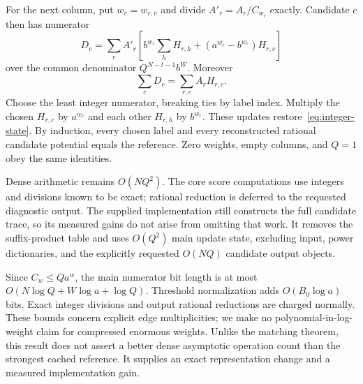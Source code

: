 For the next column, put $w_r=w_{r,v}$ and divide
$A'_r=A_r/C_{w_r}$ exactly. Candidate $c$ then has numerator
\begin{equation}\label{eq:integer-candidate}
 D_c=\sum_r A'_r\left[
 b^{w_r}\sum_hH_{r,h}+(a^{w_r}-b^{w_r})H_{r,c}\right]
\end{equation}
over the common denominator $Q^{N-t-1}b^W$. Moreover
\[
 \sum_cD_c=\sum_{r,c}A_rH_{r,c}.
\]
Choose the least integer numerator, breaking ties by label index. Multiply
the chosen $H_{r,c}$ by $a^{w_r}$ and each other $H_{r,h}$ by $b^{w_r}$.
These updates restore~\eqref{eq:integer-state}. By induction, every chosen
label and every reconstructed rational candidate potential equals the
reference. Zero weights, empty columns, and $Q=1$ obey the same identities.

Dense arithmetic remains $O(NQ^2)$. The core score computations use integers
and divisions known to be exact; rational reduction is deferred to the
requested diagnostic output. The supplied implementation still constructs
the full candidate trace, so its measured gains do not arise from omitting
that work. It removes the suffix-product table and uses $O(Q^2)$ main update
state, excluding input, power dictionaries, and the explicitly requested
$O(NQ)$ candidate output objects.

Since $C_w\le Qa^w$, the main numerator bit length is at most
$O(N\log Q+W\log a+\log Q)$. Threshold normalization adds
$O(B_0\log a)$ bits. Exact integer divisions and output rational reductions
are charged normally. These bounds concern explicit edge multiplicities;
we make no polynomial-in-log-weight claim for compressed enormous weights.
Unlike the matching theorem, this result does not assert a better dense
asymptotic operation count than the strongest cached reference. It supplies
an exact representation change and a measured implementation gain.
